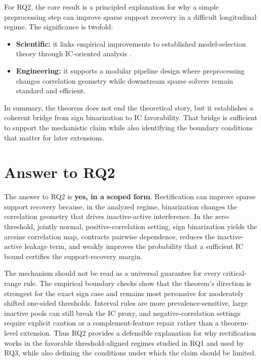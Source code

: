 For RQ2, the core result is a principled explanation for why a simple preprocessing step can improve sparse support recovery in a difficult longitudinal regime. The significance is twofold:
\begin{itemize}
    \item \textbf{Scientific:} it links empirical improvements to established model-selection theory through IC-oriented analysis \autocite{PZhao2006model}.
    \item \textbf{Engineering:} it supports a modular pipeline design where preprocessing changes correlation geometry while downstream sparse solvers remain standard and efficient.
\end{itemize}

In summary, the theorem does not end the theoretical story, but it establishes a coherent bridge from sign binarization to IC favorability. That bridge is sufficient to support the mechanistic claim while also identifying the boundary conditions that matter for later extensions.

\section{Answer to RQ2}

The answer to RQ2 is \textbf{yes, in a scoped form}. Rectification can improve sparse support recovery because, in the analyzed regime, binarization changes the correlation geometry that drives inactive-active interference. In the zero-threshold, jointly normal, positive-correlation setting, sign binarization yields the arcsine correlation map, contracts pairwise dependence, reduces the inactive-active leakage term, and weakly improves the probability that a sufficient IC bound certifies the support-recovery margin.

The mechanism should not be read as a universal guarantee for every critical-range rule. The empirical boundary checks show that the theorem's direction is strongest for the exact sign case and remains most persuasive for moderately shifted one-sided thresholds. Interval rules are more prevalence-sensitive, large inactive pools can still break the IC proxy, and negative-correlation settings require explicit caution or a complement-feature repair rather than a theorem-level extension. Thus RQ2 provides a defensible explanation for why rectification works in the favorable threshold-aligned regimes studied in RQ1 and used by RQ3, while also defining the conditions under which the claim should be limited.

